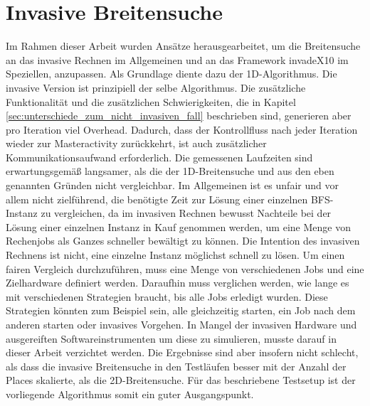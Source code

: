 \section{Invasive Breitensuche} %
\label{sec:invasive_breitensuche}
Im Rahmen dieser Arbeit wurden Ansätze herausgearbeitet, um die Breitensuche an das invasive Rechnen im Allgemeinen und an das Framework invadeX10 im Speziellen, anzupassen. Als Grundlage diente dazu der 1D-Algorithmus. Die invasive Version ist prinzipiell der selbe Algorithmus. Die zusätzliche Funktionalität und die zusätzlichen Schwierigkeiten, die in Kapitel \ref{sec:unterschiede_zum_nicht_invasiven_fall} beschrieben sind, generieren aber pro Iteration viel Overhead. Dadurch, dass der Kontrollfluss nach jeder Iteration wieder zur Masteractivity zurückkehrt, ist auch zusätzlicher Kommunikationsaufwand erforderlich. Die gemessenen Laufzeiten sind erwartungsgemäß  langsamer, als die der 1D-Breitensuche und aus den eben genannten Gründen nicht vergleichbar. Im Allgemeinen ist es unfair und vor allem nicht zielführend, die benötigte Zeit zur Lösung einer einzelnen BFS-Instanz zu vergleichen, da im invasiven Rechnen bewusst Nachteile bei der Lösung einer einzelnen Instanz in Kauf genommen werden, um eine Menge von Rechenjobs als Ganzes schneller bewältigt zu können. Die Intention des invasiven Rechnens ist nicht, eine einzelne Instanz möglichst schnell zu lösen. Um einen fairen Vergleich durchzuführen, muss eine Menge von verschiedenen Jobs und eine Zielhardware definiert werden. Daraufhin muss verglichen werden, wie lange es mit verschiedenen Strategien braucht, bis alle Jobs erledigt wurden. Diese Strategien könnten zum Beispiel sein, alle gleichzeitig starten, ein Job nach dem anderen starten oder invasives Vorgehen. In Mangel der invasiven Hardware und ausgereiften Softwareinstrumenten um diese zu simulieren, musste darauf in dieser Arbeit verzichtet werden. Die Ergebnisse sind aber insofern nicht schlecht, als dass die invasive Breitensuche in den Testläufen besser mit der Anzahl der Places skalierte, als die 2D-Breitensuche.  Für das beschriebene Testsetup ist der vorliegende Algorithmus somit ein guter Ausgangspunkt.


